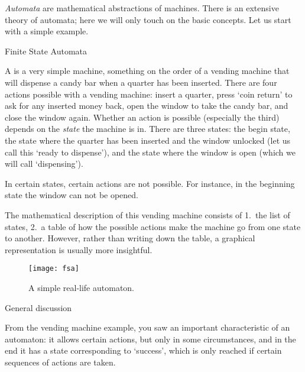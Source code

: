 

\emph{Automata} are mathematical abstractions of machines. 
There is an extensive theory of automata; here we will only touch on the basic concepts.
Let us start with a simple example.

 {Finite State Automata}

A  is a very simple machine, something on the order of
a vending machine that will dispense a candy bar when a
quarter has been inserted. There are four actions possible with a
vending machine: insert a quarter, press `coin return' to ask for any
inserted money back, open the window to take the candy bar, and close
the window again. Whether an action is possible (especially the third)
depends on the \emph{state} the machine is in. There are three states:
the begin state, the state where the quarter has been inserted and the
window unlocked (let us call this `ready to dispense'), and the state
where the window is open (which we will call `dispensing').

In certain states, certain
actions are not possible. For instance, in the beginning state the
window can not be opened.

The mathematical description of this vending machine consists of
1.~the list of states, 2.~a table of how the possible actions make the
machine go from one state to another. However, rather than writing
down the table, a graphical representation is usually more insightful.

\begin{figure}[ht]
  \texttt{[image: fsa]}
  \caption{A simple real-life automaton.}
  \label{fig:automaton}
\end{figure}

 {General discussion}

From the vending machine example, you saw an important characteristic of an automaton: 
it allows certain actions, but only in some circumstances, and in the end it has a 
state corresponding to `success', which is only reached if certain sequences of actions
are taken.

